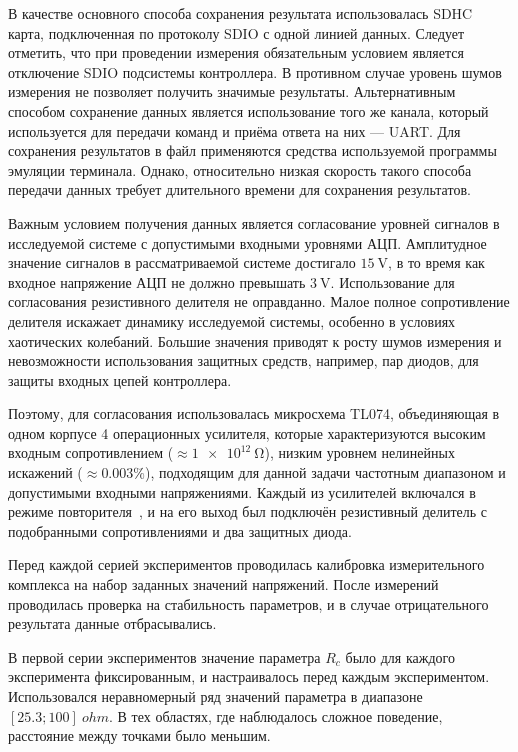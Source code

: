 В качестве основного способа сохранения результата
использовалась SDHC карта, подключенная по протоколу SDIO с одной линией данных.
Следует отметить, что при проведении измерения обязательным условием
является отключение SDIO подсистемы контроллера.
В противном случае уровень шумов измерения не позволяет
получить значимые результаты.
Альтернативным способом сохранение данных является
использование того же канала, который используется для передачи команд
и приёма ответа на них --- UART. Для сохранения результатов в файл
применяются средства используемой программы эмуляции терминала.
Однако, относительно низкая скорость такого способа передачи данных
требует длительного времени для сохранения результатов.

Важным условием получения данных является согласование уровней
сигналов в исследуемой системе с допустимыми входными уровнями АЦП.
Амплитудное значение сигналов в рассматриваемой системе достигало
$\SI{15}{\volt}$, в то время как входное напряжение АЦП не должно
превышать $\SI{3}{\volt}$.
Использование для согласования резистивного делителя
не оправданно. Малое полное сопротивление делителя
искажает динамику исследуемой системы, особенно в условиях
хаотических колебаний. Большие значения приводят
к росту шумов измерения и невозможности
использования защитных средств, например, пар диодов,
для защиты входных цепей контроллера.

Поэтому, для согласования использовалась микросхема TL074,
объединяющая в одном корпусе 4 операционных усилителя,
которые характеризуются высоким входным сопротивлением ($\approx \SI{1e12}{\ohm}$),
низким уровнем нелинейных искажений ($\approx 0.003\%$),
подходящим для данной задачи частотным диапазоном
и допустимыми входными напряжениями.
Каждый из усилителей включался в режиме повторителя~\cite{horowitz},
и на его выход был подключён резистивный делитель
с подобранными сопротивлениями и два защитных диода.

Перед каждой серией экспериментов проводилась калибровка
измерительного комплекса на набор заданных значений напряжений.
После измерений проводилась проверка на стабильность
параметров, и в случае отрицательного результата
данные отбрасывались.

В первой серии экспериментов значение параметра
$R_c$ было для каждого эксперимента фиксированным,
и настраивалось перед каждым экспериментом.
Использовался неравномерный ряд значений параметра в диапазоне $[ 25.3 ; 100]\SI{}{ohm} $.
В тех областях, где наблюдалось сложное поведение, расстояние между точками было меньшим.

